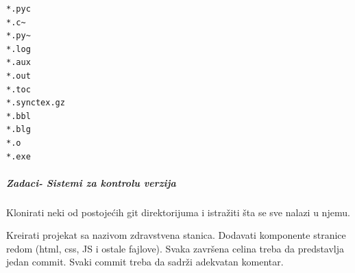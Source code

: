\begin{lstlisting}[backgroundcolor = \color{lightgray}, breaklines=true]
*.pyc
*.c~
*.py~
*.log
*.aux
*.out
*.toc
*.synctex.gz
*.bbl
*.blg
*.o
*.exe 
\end{lstlisting}

\subparagraph{Zadaci- Sistemi za kontrolu verzija}

\begin{primer}
Klonirati neki od postojećih git direktorijuma i istražiti šta se sve nalazi u njemu.
\end{primer}

\begin{primer}
Kreirati projekat sa nazivom zdravstvena stanica. Dodavati komponente stranice redom (html, css, JS i ostale fajlove). Svaka završena celina treba da predstavlja jedan commit. Svaki commit treba da sadrži adekvatan komentar.
\end{primer}

